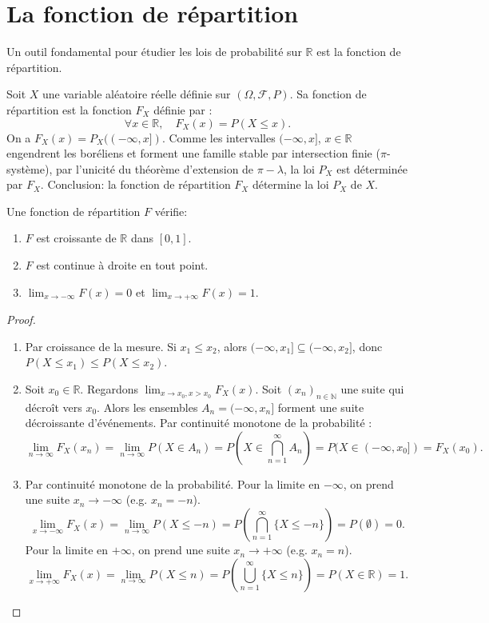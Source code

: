 \section{La fonction de répartition}
Un outil fondamental pour étudier les lois de probabilité sur $\mathbb{R}$ est la fonction de répartition.
\begin{definition}
Soit $X$ une variable aléatoire réelle définie sur $(\Omega, \mathcal{F}, P)$. Sa fonction de répartition est la fonction $F_X$ définie par :
\[
\forall x \in \mathbb{R}, \quad F_X(x) = P(X \le x).
\]
On a $F_X(x) = P_X((-\infty, x])$. Comme les intervalles $(-\infty, x]$, $x \in \mathbb{R}$ engendrent les boréliens et forment une famille stable par intersection finie ($\pi$-système), par l'unicité du théorème d'extension de $\pi-\lambda$, la loi $P_X$ est déterminée par $F_X$.
Conclusion: la fonction de répartition $F_X$ détermine la loi $P_X$ de $X$.
\end{definition}
Une fonction de répartition $F$ vérifie:
\begin{enumerate}
    \item[i)] $F$ est croissante de $\mathbb{R}$ dans $[0, 1]$.
    \item[ii)] $F$ est continue à droite en tout point.
    \item[iii)] $\lim_{x \to -\infty} F(x) = 0$ et $\lim_{x \to +\infty} F(x) = 1$.
\end{enumerate}
\begin{proof}
\begin{enumerate}
    \item[i)] Par croissance de la mesure. Si $x_1 \le x_2$, alors $(-\infty, x_1] \subseteq (-\infty, x_2]$, donc $P(X \le x_1) \le P(X \le x_2)$.
    \item[ii)] Soit $x_0 \in \mathbb{R}$. Regardons $\lim_{x \to x_0, x > x_0} F_X(x)$.
    Soit $(x_n)_{n \in \mathbb{N}}$ une suite qui décroît vers $x_0$. Alors les ensembles $A_n = (-\infty, x_n]$ forment une suite décroissante d'événements. Par continuité monotone de la probabilité :
    \[
    \lim_{n \to \infty} F_X(x_n) = \lim_{n \to \infty} P(X \in A_n) = P(X \in \bigcap_{n=1}^\infty A_n) = P(X \in (-\infty, x_0]) = F_X(x_0).
    \]
    \item[iii)] Par continuité monotone de la probabilité. Pour la limite en $-\infty$, on prend une suite $x_n \to -\infty$ (e.g. $x_n=-n$).
    \[
    \lim_{x \to -\infty} F_X(x) = \lim_{n \to \infty} P(X \le -n) = P(\bigcap_{n=1}^\infty \{X \le -n\}) = P(\emptyset) = 0.
    \]
    Pour la limite en $+\infty$, on prend une suite $x_n \to +\infty$ (e.g. $x_n=n$).
    \[
    \lim_{x \to +\infty} F_X(x) = \lim_{n \to \infty} P(X \le n) = P(\bigcup_{n=1}^\infty \{X \le n\}) = P(X \in \mathbb{R}) = 1.
    \]
\end{enumerate}
\end{proof}

